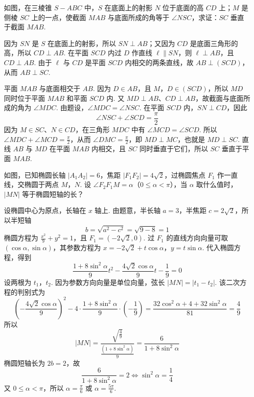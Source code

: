 \documentclass[UTF8,a4paper,oneside,11pt]{ctexbook}
\begin{document}
\begin{problem}
如图，在三棱锥 \(S - ABC\) 中，\(S\) 在底面上的射影 \(N\) 位于底面的高 \(CD\) 上；\(M\) 是侧棱 \(SC\) 上的一点，使截面 \(MAB\) 与底面所成的角等于 \(\angle NSC\)，求证：\(SC\) 垂直于截面 \(MAB\).


\begin{solution}
因为 \(SN\) 是 \(S\) 在底面上的射影，所以 \(SN\perp AB\)；又因为 \(CD\) 是底面三角形的高，所以 \(CD\perp AB\). 在平面 \(SCD\) 内过 \(D\) 作直线 \(\ell\parallel SN\)，则 \(\ell\perp AB\)，且 \(CD\perp AB\). 由于 \(\ell\) 与 \(CD\) 是平面 \(SCD\) 内相交的两条直线，故 \(AB\perp\left(SCD\right)\)，从而 \(AB\perp SC\).

平面 \(MAB\) 与底面相交于 \(AB\). 因为 \(D\in AB\)，且 \(M\)，\(D\in\left(SCD\right)\)，所以 \(MD\) 同时位于平面 \(MAB\) 和平面 \(SCD\) 内. 又 \(MD\perp AB\)、\(CD\perp AB\)，故截面与底面所成的角为 \(\angle MDC\). 由题设，\(\angle MDC=\angle NSC\). 在平面 \(SCD\) 内，\(SN\perp CD\)，因此
\[
\angle NSC+\angle SCD=\frac{\pi}{2}
\]
因为 \(M\in SC\)、\(N\in CD\)，在三角形 \(MDC\) 中有 \(\angle MCD=\angle SCD\). 所以 \(\angle MDC+\angle MCD=\frac{\pi}{2}\)，从而 \(\angle DMC=\frac{\pi}{2}\)，即 \(MD\perp MC\)，也就是 \(MD\perp SC\). 直线 \(AB\) 与 \(MD\) 在平面 \(MAB\) 内相交，且 \(SC\) 同时垂直于它们，所以 \(SC\) 垂直于平面 \(MAB\).
\end{solution}
\end{problem}

\begin{problem}
如图，已知椭圆长轴 \(\left|A_{1}A_{2}\right| = 6\)，焦距 \(\left|F_{1}F_{2}\right| = 4\sqrt{2}\)，过椭圆焦点 \(F_{1}\) 作一直线，交椭圆于两点 \(M\)，\(N\). 设 \(\angle F_{2}F_{1}M = \alpha\)（\(0 \leqslant \alpha < \pi\)），当 \(\alpha\) 取什么值时，\(|MN|\) 等于椭圆短轴的长？


\begin{solution}
设椭圆中心为原点，长轴在 \(x\) 轴上. 由题意，半长轴 \(a=3\)，半焦距 \(c=2\sqrt{2}\)，所以半短轴
\[
b=\sqrt{a^{2}-c^{2}}=\sqrt{9-8}=1
\]
椭圆方程为 \(\frac{x^{2}}{9}+y^{2}=1\)，且 \(F_{1}=(-2\sqrt{2},0)\). 过 \(F_{1}\) 的直线方向向量可取 \((\cos\alpha,\sin\alpha)\)，其参数方程为
\(x=-2\sqrt{2}+t\cos\alpha\)，\(y=t\sin\alpha\).
代入椭圆方程，得到
\[
\frac{1+8\sin^{2}\alpha}{9}t^{2}-\frac{4\sqrt{2}\cos\alpha}{9}t-\frac{1}{9}=0
\]
设两根为 \(t_{1}\)，\(t_{2}\). 因为参数方向向量是单位向量，弦长 \(|MN|=|t_{1}-t_{2}|\). 该二次方程的判别式为
\[
\left(-\frac{4\sqrt{2}\cos\alpha}{9}\right)^{2}
-4\cdot\frac{1+8\sin^{2}\alpha}{9}\cdot\left(-\frac{1}{9}\right)
=\frac{32\cos^{2}\alpha+4+32\sin^{2}\alpha}{81}
=\frac{4}{9}
\]
所以
\[
|MN|=\frac{\sqrt{\frac{4}{9}}}{\frac{(1+8\sin^{2}\alpha)}{9}}=\frac{6}{1+8\sin^{2}\alpha}
\]
椭圆短轴长为 \(2b=2\)，故
\[
\frac{6}{1+8\sin^{2}\alpha}=2\iff \sin^{2}\alpha=\frac14
\]
又 \(0\leqslant\alpha<\pi\)，所以 \(\alpha=\frac{\pi}{6}\) 或 \(\alpha=\frac{5\pi}{6}\).
\end{solution}
\end{problem}
\end{document}
